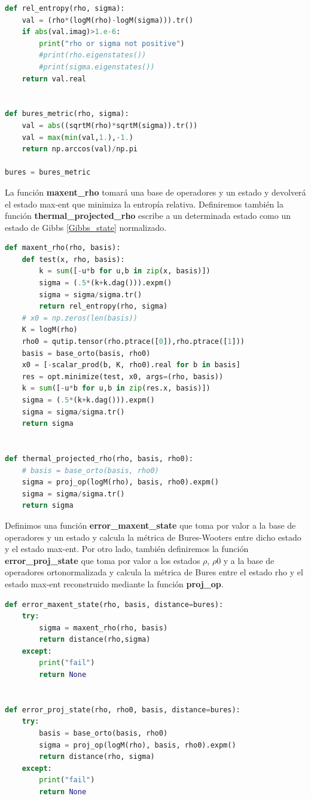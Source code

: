 \documentclass{report} %
\numberwithin{equation}{section}
\begin{document}
\begin{lstlisting}[language=Python]
def rel_entropy(rho, sigma):
    val = (rho*(logM(rho)-logM(sigma))).tr()
    if abs(val.imag)>1.e-6:
        print("rho or sigma not positive")
        #print(rho.eigenstates())
        #print(sigma.eigenstates())
    return val.real


def bures_metric(rho, sigma):
    val = abs((sqrtM(rho)*sqrtM(sigma)).tr())
    val = max(min(val,1.),-1.)
    return np.arccos(val)/np.pi
        
bures = bures_metric
\end{lstlisting}

La función \textbf{maxent_rho} tomará una base de operadores y un estado y devolverá el estado max-ent que minimiza la entropía relativa. Definiremos también la función \textbf{thermal_projected_rho} escribe a un determinada estado como un estado de Gibbs \eqref{Gibbs_state} normalizado.

\begin{lstlisting}[language=Python]
def maxent_rho(rho, basis):   
    def test(x, rho, basis):
        k = sum([-u*b for u,b in zip(x, basis)])        
        sigma = (.5*(k+k.dag())).expm()
        sigma = sigma/sigma.tr()
        return rel_entropy(rho, sigma)    
    # x0 = np.zeros(len(basis))
    K = logM(rho)
    rho0 = qutip.tensor(rho.ptrace([0]),rho.ptrace([1]))
    basis = base_orto(basis, rho0)
    x0 = [-scalar_prod(b, K, rho0).real for b in basis]
    res = opt.minimize(test, x0, args=(rho, basis))
    k = sum([-u*b for u,b in zip(res.x, basis)])        
    sigma = (.5*(k+k.dag())).expm()
    sigma = sigma/sigma.tr()
    return sigma
    
    
def thermal_projected_rho(rho, basis, rho0):
    # basis = base_orto(basis, rho0)
    sigma = proj_op(logM(rho), basis, rho0).expm()
    sigma = sigma/sigma.tr()
    return sigma
\end{lstlisting}

Definimos una función \textbf{error_maxent_state} que toma por valor a la base de operadores y un estado y calcula la métrica de Bures-Wooters entre dicho estado y el estado max-ent. Por otro lado, también definiremos la función \textbf{error_proj_state} que toma por valor a los estados $\rho$, $\rho0$ y a la base de operadores ortonormalizada y calcula la métrica de Bures entre el estado rho y el estado max-ent reconstruido mediante la función \textbf{proj_op}. 

\begin{lstlisting}[language=Python]
def error_maxent_state(rho, basis, distance=bures):
    try:
        sigma = maxent_rho(rho, basis)
        return distance(rho,sigma)
    except:
        print("fail")
        return None
    
    
def error_proj_state(rho, rho0, basis, distance=bures):
    try:
        basis = base_orto(basis, rho0)
        sigma = proj_op(logM(rho), basis, rho0).expm()
        return distance(rho, sigma)
    except:
        print("fail")
        return None
    
\end{lstlisting}
\end{document}
